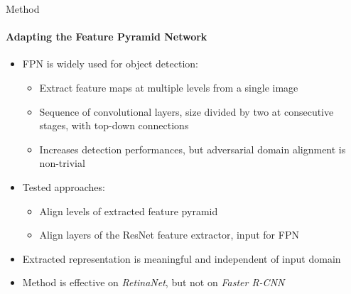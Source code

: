 \documentclass[aspectratio=141]{beamer}
\begin{document}
\begin{frame}[t]{Method}
    \framesubtitle{Adapting the Feature Pyramid Network}
    
    \begin{itemize}
        \item<1-> \alert{FPN} is widely used for object detection:
        \begin{itemize}
            \item Extract feature maps at multiple levels from a single image
            \item Sequence of convolutional layers, size divided by two at consecutive stages, with top-down connections
            \item Increases detection performances, but adversarial domain alignment is non-trivial
        \end{itemize}
        \item<2-> Tested approaches:
        \begin{itemize}
            \item Align levels of extracted feature pyramid
            \item Align layers of the \alert{ResNet} feature extractor, input for FPN
        \end{itemize}
        \item<2-> Extracted representation is meaningful and independent of input domain
        \vspace*{5mm}
        \item<3-> Method is effective on \textit{RetinaNet}, but not on \textit{Faster R-CNN}
    \end{itemize}
\end{frame}
\end{document}
